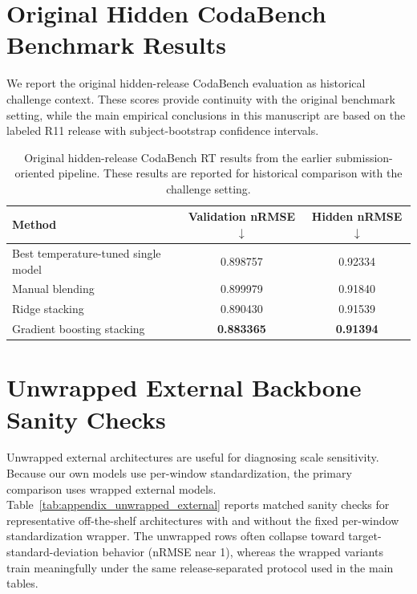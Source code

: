 \documentclass[12pt]{article}
\begin{document}
\appendix

\section{Original Hidden CodaBench Benchmark Results}

We report the original hidden-release CodaBench evaluation as historical challenge context. These scores provide continuity with the original benchmark setting, while the main empirical conclusions in this manuscript are based on the labeled R11 release with subject-bootstrap confidence intervals.

\begin{table}[!h]
\centering
\caption{Original hidden-release CodaBench RT results from the earlier submission-oriented pipeline. These results are reported for historical comparison with the challenge setting.}
\label{tab:appendix_codabench}
\small
\setlength{\tabcolsep}{8pt}
\renewcommand{\arraystretch}{1.15}
\begin{tabular}{lcc}
\toprule
\textbf{Method} & \textbf{Validation nRMSE} $\downarrow$ & \textbf{Hidden nRMSE} $\downarrow$ \\
\midrule
Best temperature-tuned single model & 0.898757 & 0.92334 \\
Manual blending & 0.899979 & 0.91840 \\
Ridge stacking & 0.890430 & 0.91539 \\
Gradient boosting stacking & \textbf{0.883365} & \textbf{0.91394} \\
\bottomrule
\end{tabular}
\end{table}

\section{Unwrapped External Backbone Sanity Checks}

Unwrapped external architectures are useful for diagnosing scale sensitivity. Because our own models use per-window standardization, the primary comparison uses wrapped external models. Table~\ref{tab:appendix_unwrapped_external} reports matched sanity checks for representative off-the-shelf architectures with and without the fixed per-window standardization wrapper. The unwrapped rows often collapse toward target-standard-deviation behavior (nRMSE near 1), whereas the wrapped variants train meaningfully under the same release-separated protocol used in the main tables.
\end{document}
